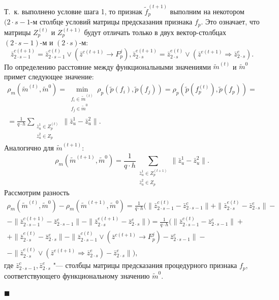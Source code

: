 \documentclass[a4paper, 12pt]{article}
\theoremstyle{plain}
\newenvironment{Proof}%
	{\par\noindent{\bf Доказательство.}}%
	{\hfill$\scriptstyle\blacksquare$}
\begin{document}
\begin{Proof}
		Т.~к. выполнено условие шага 1, то признак $\tilde f_p^{(t+1)}$ выполним на некотором $(2\cdot s-1$-м столбце условий матрицы предсказания признака $f_p$. Это означает, что матрицы $Z_p^{(t)}$ и $Z_p^{(t+1)}$ будут отличать только в двух вектор-столбцах $(2\cdot s-1)$-м и $(2\cdot s)$-м:
		\begin{equation}
		\bar z_{2\cdot s-1}^{c(t+1)}=\bar z_{2\cdot s-1}^{c(t)}\vee (\bar z^{c(t+1)}\rightarrow F_p^j),\bar z_{2\cdot s}^{e(t+1)}=\bar z_{2\cdot s}^{e(t)}\vee(\bar z^{e(t+1)}\Rightarrow \bar z_{2\cdot s}^e).
		\end{equation}
		По определению расстояние между функциональными значениями $\tilde m^{(t)}$ и $\tilde m^0$ примет следующее значение:
		\begin{eqnarray}
		\rho_m(\tilde m^{(t)},\tilde m^0)=\min\limits_{\substack{f_i\in\tilde m^{(t)}\\f_j\in\tilde m^0}}\rho_p(\tilde p(f_i),\tilde p(f_j ))=\rho_p(\tilde p(f_p^{(t)}),\tilde p(f_p))=\nonumber \\
		=\frac{1}{q\cdot h}\sum\limits_{\substack{\bar z_u^1\in Z_p^{(t)}\\\bar z_u^2\in Z_p}}\|\bar z_u^1-\bar z_u^2\|.
		\end{eqnarray}
		Аналогично для $\tilde m^{(t+1)}$:
		\begin{equation}
		\rho_m(\tilde m^{(t+1)},\tilde m^0)=\frac{1}{q\cdot h}\sum_{\substack{\bar z_u^1\in Z_p^{(t+1)}\\\bar z_u^2\in Z_p}}\|\bar z_u^1-\bar z_u^2\|.
		\end{equation}
		Рассмотрим разность 
		\begin{eqnarray}
		\rho_m(\tilde m^{(t)},\tilde m^0)-\rho_m(\tilde m^{(t+1)},\tilde m^0)=\frac{1}{q\cdot h}(\|\bar z_{2\cdot s-1}^{c(t)}-\bar z_{2\cdot s-1}^c\|+\|\bar z_{2\cdot s}^{e(t)}-\bar z_{2\cdot s}^e\|-\nonumber \\
		-\|\bar z_{2\cdot s-1}^{c(t+1)}-\bar z_{2\cdot s-1}^c\|-\|\bar z_{2\cdot s}^{e(t+1)}-\bar z_{2\cdot s}^e\|)=\frac{1}{q\cdot h}(\|\bar z_{2\cdot s-1}^{c(t)}-\bar z_{2\cdot s-1}^c\|+\nonumber \\
		+\|\bar z_{2\cdot s}^{e(t)}-\bar z_{2\cdot s}^e\|-\|\bar z_{2\cdot s-1}^{c(t)}\vee(\bar z^{c(t+1)}\rightarrow F_p^j)-\bar z_{2\cdot s-1}^c\|-\nonumber \\
		-\|\bar z_{2\cdot s}^{e(t)}\vee(\bar z^{e(t+1)}\Rightarrow\bar z_{2\cdot s}^e)-\bar z_{2\cdot s}^e\|),
		\end{eqnarray}
		где $\bar z_{2\cdot s-1}^c,\bar z_{2\cdot s}^e$ "--- столбцы матрицы предсказания процедурного признака $f_p$, соответствующего функциональному значению $\tilde m^0$.
		

\end{Proof}
\end{document}
